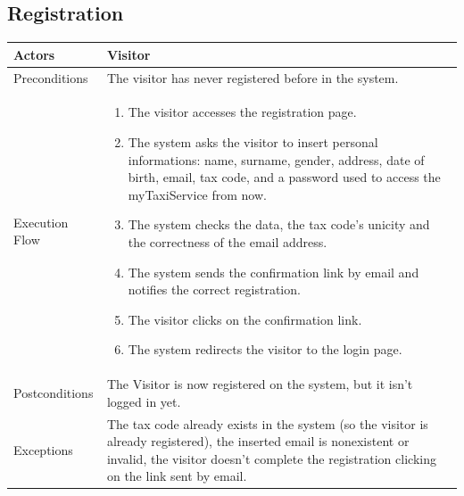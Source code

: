 \clearpage

\subsection{Registration}
\label{requirements:Registration}
\begin{tabular}{lp{8cm}}
	\hline 
	Actors & Visitor  \\ \hline
	Preconditions & The visitor has never registered before in the system.  \\ \hline
	Execution Flow &  \begin{enumerate}
					\item The visitor accesses the registration page.
					\item The system asks the visitor to insert personal informations: name, surname, gender, address, date of birth, email, tax code, and a password used to access the myTaxiService from now.
					\item The system checks the data, the tax code's unicity and the correctness of the email address.
					\item The system sends the confirmation link by email and notifies the correct registration.
					\item The visitor clicks on the confirmation link.
					\item The system redirects the visitor to the login page.
				\end{enumerate}
	 \\ \hline
	 Postconditions & The Visitor is now registered on the system, but it isn't logged in yet. \\ \hline
	 Exceptions &  The tax code already exists in the system (so the visitor is already registered), the inserted email is nonexistent or invalid, the visitor doesn't complete the registration clicking on the link sent by email.  \\ \hline
\end{tabular}

\clearpage

